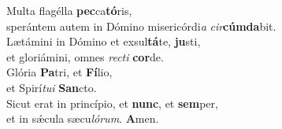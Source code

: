 \oddverse Multa flagélla \textbf{pec}ca\textbf{tó}ris,~\*\\
\oddverse sperántem autem in Dómino misericórdi\textit{a} \textit{cir}\textbf{cúm}\textbf{da}bit.\\
\evenverse Lætámini in Dómino et exsul\textbf{tá}te, \textbf{ju}sti,~\*\\
\evenverse et gloriámini, omnes \textit{re}\textit{cti} \textbf{cor}de.\\
\oddverse Glória \textbf{Pa}tri, et \textbf{Fí}lio,~\*\\
\oddverse et Spirí\textit{tu}\textit{i} \textbf{San}cto.\\
\evenverse Sicut erat in princípio, et \textbf{nunc}, et \textbf{sem}per,~\*\\
\evenverse et in sǽcula sæcu\textit{ló}\textit{rum}. \textbf{A}men.\\
